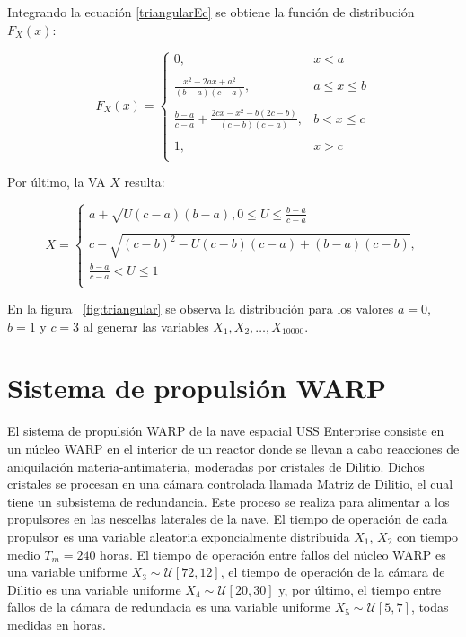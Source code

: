 \documentclass{sig-alternate}
\begin{document}
Integrando la ecuaci\'{o}n \ref{triangularEc} se obtiene la funci\'{o}n de 
distribuci\'{o}n $F_{X}(x)$:

\begin{equation}
\label{triangularIntegrada}
F_{X}(x) = 
    \begin{cases}
    0, & x < a\\
     \ \\
    \frac{x^{2} - 2ax + a^{2}}{(b-a)(c-a)}, &  a \le x \le b\\
     \ \\
    \frac{b-a}{c-a} + \frac{2cx - x^{2} - b(2c-b)}{(c-b)(c-a)}, & b < x \le c\\
     \ \\
     1, & x > c\\
    \end{cases}
\end{equation}

Por \'{u}ltimo, la VA $X$ resulta:

\begin{equation}
\label{vaconftriangular}
X = 
    \begin{cases}
    a + \sqrt{U(c-a)(b-a)}, 0 \leq U \leq \frac{b-a}{c-a} \\
    \ \\
    c - \sqrt{(c-b)^{2} - U(c-b)(c-a) + (b-a)(c-b)}, \\ \frac{b-a}{c-a} < U \leq 1 \\
    \end{cases}
\end{equation}

En la figura ~\ref{fig:triangular} se observa la distribuci\'{o}n para los
valores $a = 0$, $b = 1$ y $c = 3$ al generar las variables $X_{1}, X_{2},
\dots, X_{10000}$.

\section{Sistema de propulsi\'{o}n WARP}\label{simulacionpropulsor}
El sistema de propulsi\'on WARP de la nave espacial USS Enterprise consiste en un n\'ucleo WARP
en el interior de un reactor donde se llevan a cabo reacciones de aniquilaci\'on 
materia-antimateria, moderadas por cristales de Dilitio. Dichos cristales se
procesan en una c\'amara controlada llamada Matriz de Dilitio, el cual tiene
un subsistema de redundancia. Este proceso se realiza para alimentar a los 
propulsores en las nescellas laterales de la nave. El tiempo de operaci\'on de 
cada propulsor es una variable aleatoria exponcialmente distribuida $X_1$,  $X_2$ 
con tiempo medio $T_m = 240$ horas. El tiempo de operaci\'on entre fallos del n\'ucleo 
WARP es una variable uniforme $X_3 \sim \mathcal{U}[72,12]$, el tiempo de operaci\'on 
de la c\'amara de Dilitio es una variable uniforme $X_4 \sim \mathcal{U}[20,30]$ y, por 
\'ultimo, el tiempo entre fallos de la c\'amara de redundacia es una variable uniforme 
$X_5 \sim \mathcal{U}[5,7]$, todas medidas en horas.
\end{document}
